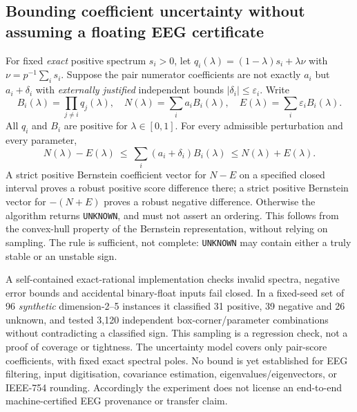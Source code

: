 \subsection{Bounding coefficient uncertainty without assuming a floating EEG certificate}
\label{sec:p4-coeff-uncertain}
For fixed \emph{exact} positive spectrum $s_i>0$, let
$q_i(\lambda)=(1-\lambda)s_i+\lambda\nu$ with
$\nu=p^{-1}\sum_i s_i$. Suppose the pair numerator
coefficients are not exactly $a_i$ but $a_i+\delta_i$ with
\emph{externally justified} independent bounds
$|\delta_i|\leq\varepsilon_i$. Write
\[
B_i(\lambda)=\prod_{j\neq i}q_j(\lambda),\quad
N(\lambda)=\sum_i a_iB_i(\lambda),\quad
E(\lambda)=\sum_i\varepsilon_iB_i(\lambda).
\]
All $q_i$ and $B_i$ are positive for $\lambda\in[0,1]$.
For every admissible perturbation and every parameter,
\[
N(\lambda)-E(\lambda)\ \leq\
\sum_i(a_i+\delta_i)B_i(\lambda)\
\leq N(\lambda)+E(\lambda).
\]
A strict positive Bernstein coefficient vector for
$N-E$ on a specified closed interval proves a robust
positive score difference there; a strict positive
Bernstein vector for $-(N+E)$ proves a robust negative
difference. Otherwise the algorithm returns
\texttt{UNKNOWN}, and must not assert an ordering.
This follows from the convex-hull property of the
Bernstein representation, without relying on sampling.
The rule is sufficient, not complete: \texttt{UNKNOWN}
may contain either a truly stable or an unstable sign.

A self-contained exact-rational implementation checks invalid
spectra, negative error bounds and accidental binary-float
inputs fail closed. In a fixed-seed set of 96 \emph{synthetic}
dimension-2--5 instances it classified 31 positive,
39 negative and 26 unknown, and tested 3,120
independent box-corner/parameter combinations without
contradicting a classified sign. This sampling is a
regression check, not a proof of coverage or tightness.
The uncertainty model covers only pair-score coefficients,
with fixed exact spectral poles. No bound is yet established
for EEG filtering, input digitisation, covariance estimation,
eigenvalues/eigenvectors, or IEEE-754 rounding. Accordingly
the experiment does not license an end-to-end
machine-certified EEG provenance or transfer claim.
